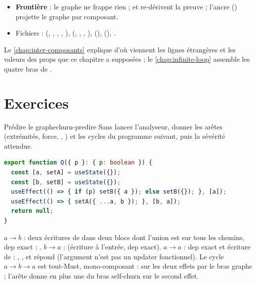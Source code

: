\begin{resume}
\begin{itemize}
        interdit de lire des faits sur les props d'un composant où une boucle peut entrer.
  \item \textbf{Frontière} : le graphe ne frappe rien ;  et
         re-dérivent la preuve ; l'ancre 
        () projette le graphe par composant.
  \item Fichiers :  (, ,
        , , ),
         (, ,
        , ), 
        (),  (),
        .
\end{itemize}
Le \cref{chap:inter-composants} explique d'où viennent les lignes étrangères et les valeurs
 des props que ce chapitre a supposées ; le \cref{chap:infinite-loop}
assemble les quatre bras de .
\end{resume}

\section{Exercices}
\label{sec:churn-exercices}

\begin{exercice}{Prédire le graphe}{churn-predire}
Sans lancer l'analyseur, donner les arêtes (extrémités, force, ,
) et les cycles du programme suivant, puis la sévérité attendue.
\begin{lstlisting}[language=TypeScript]
export function Q({ p }: { p: boolean }) {
  const [a, setA] = useState({});
  const [b, setB] = useState({});
  useEffect(() => { if (p) setB({ a }); else setB({}); }, [a]);
  useEffect(() => { setA({ ...a, b }); }, [b, a]);
  return null;
}
\end{lstlisting}
\end{exercice}
\begin{solution}
$a \to b$ : deux écritures  de  dans deux blocs dont l'union est sur tous
les chemins, dep exact : . $b \to a$ :  (écriture à l'entrée, dep
exact). $a \to a$ : dep  exact et écriture de  : ,
, et  répond  (l'argument n'est
pas un updater fonctionnel). Le cycle $a \to b \to a$ est tout-Must, mono-composant :
\Error{} sur les deux effets par le bras graphe ; l'arête  donne en plus une
\Error{} du bras self-churn sur le second effet.
\end{solution}

